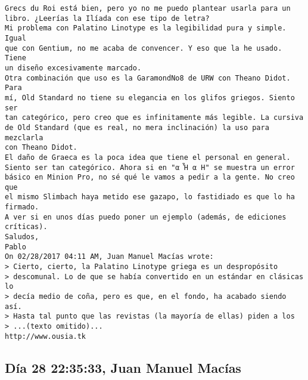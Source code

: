 \documentclass[a4paper,10pt]{article}
\begin{document}
\begin{lstlisting}
Grecs du Roi está bien, pero yo no me puedo plantear usarla para un
libro. ¿Leerías la Ilíada con ese tipo de letra?
Mi problema con Palatino Linotype es la legibilidad pura y simple. Igual
que con Gentium, no me acaba de convencer. Y eso que la he usado. Tiene
un diseño excesivamente marcado.
Otra combinación que uso es la GaramondNo8 de URW con Theano Didot. Para
mí, Old Standard no tiene su elegancia en los glifos griegos. Siento ser
tan categórico, pero creo que es infinitamente más legible. La cursiva
de Old Standard (que es real, no mera inclinación) la uso para mezclarla
con Theano Didot.
El daño de Graeca es la poca idea que tiene el personal en general.
Siento ser tan categórico. Ahora si en "α Ἦ α Η" se muestra un error
básico en Minion Pro, no sé qué le vamos a pedir a la gente. No creo que
el mismo Slimbach haya metido ese gazapo, lo fastidiado es que lo ha
firmado.
A ver si en unos días puedo poner un ejemplo (además, de ediciones
críticas).
Saludos,
Pablo
On 02/28/2017 04:11 AM, Juan Manuel Macías wrote:
> Cierto, cierto, la Palatino Linotype griega es un despropósito
> descomunal. Lo de que se había convertido en un estándar en clásicas lo
> decía medio de coña, pero es que, en el fondo, ha acabado siendo así.
> Hasta tal punto que las revistas (la mayoría de ellas) piden a los
> ...(texto omitido)...
http://www.ousia.tk

\end{lstlisting}

\subsection{Día 28 22:35:33, Juan Manuel Macías}
\end{document}
